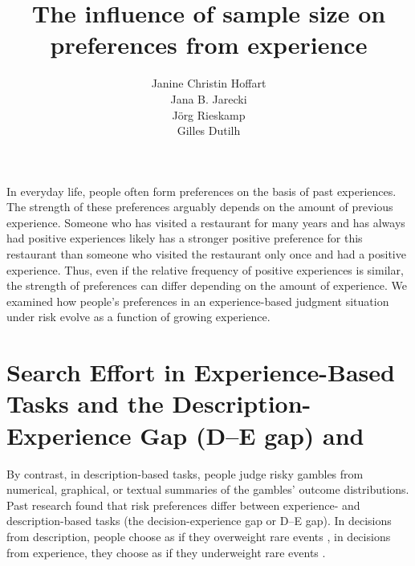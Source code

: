 \documentclass[a4paper, man, natbib, floatsintext]{apa6}
\title{The influence of sample size on preferences from experience}
\author{Janine Christin Hoffart\\Jana B. Jarecki\\J\"org Rieskamp\\Gilles Dutilh}
\affiliation{University of Basel, Department of Psychology, Center for Economic Psychology}
\begin{document}
\maketitle

In everyday life, people often form preferences on the basis of past experiences. The strength of these preferences arguably depends on the amount of previous experience. Someone who has visited a restaurant for many years and has always had positive experiences likely has a stronger positive preference for this restaurant than someone who visited the restaurant only once and had a positive experience. Thus, even if the relative frequency of positive experiences is similar, the strength of preferences can differ depending on the amount of experience. We examined how people's preferences in an experience-based judgment situation under risk evolve as a function of growing experience. 


\section{Search Effort in Experience-Based Tasks and the Description-Experience Gap (D--E gap) and }
 By contrast, in description-based tasks, people judge risky gambles from numerical, graphical, or textual summaries of the gambles' outcome distributions. Past research found that risk preferences differ between experience- and description-based tasks (the decision-experience gap or D--E gap). In decisions from description, people choose as if they overweight rare events \citep{Kahneman1979}, in decisions from experience, they choose as if they underweight rare events \citep{Hertwig2004}.
\end{document}

